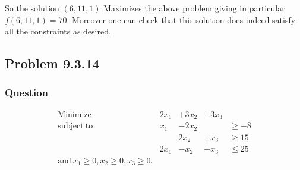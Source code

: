 \documentclass[12pt]{article}
\begin{document}
So the solution $(6,11,1)$ Maximizes the above problem giving in particular\\$f(6,11,1)=70$. Moreover one can check that this solution does indeed satisfy all the constraints as desired.


\subsection{Problem 9.3.14}
\subsubsection{Question}
\[\begin{array}{ccccc} 
\mathrm{Minimize} & 2x_1& +3x_2 & +3x_3\\
\mathrm{subject\ to}& x_1&-2x_2& &\geq -8\\
&&2x_2&+  x_3& \geq 15\\
&2x_1&-x_2&+x_3&\leq 25\\
\mathrm{and\ }x_1\geq 0, x_2\geq 0, x_3 \geq 0.
 \end{array}\]
\end{document}
